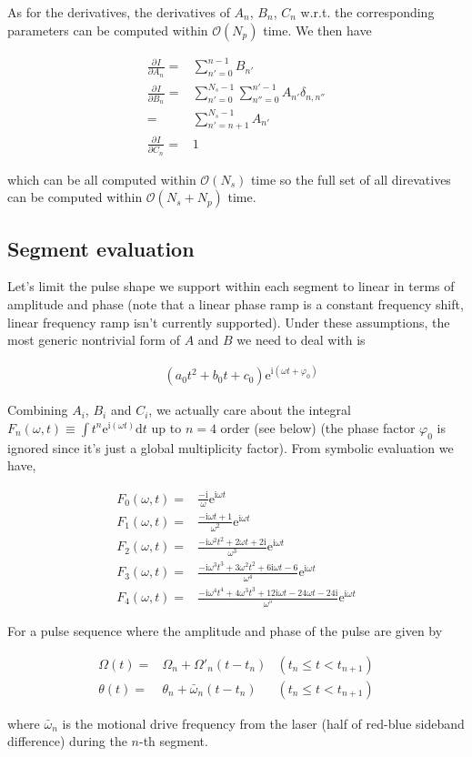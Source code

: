 \documentclass[10pt,fleqn]{article}
\newcommand{\ud}{\mathrm{d}}
\newcommand{\ue}{\mathrm{e}}
\newcommand{\ui}{\mathrm{i}}
\newcommand{\eqar}[1]
{
  \begin{align*}
    #1
  \end{align*}
}
\newcommand{\paren}[1]{{\left({#1}\right)}}
\newcommand{\pdiff}[3][{}]{{\frac{\partial^{#1} {#2}}{\partial {#3}{}^{#1}}}}
\begin{document}
As for the derivatives, the derivatives of $A_n$, $B_n$, $C_n$ w.r.t.
the corresponding parameters can be computed within $\mathcal{O}(N_p)$ time.
We then have
\eqar{
  \pdiff{I}{A_n}=&\sum_{n'=0}^{n-1}B_{n'}\\
  \pdiff{I}{B_n}=&\sum_{n'=0}^{N_s-1}\sum_{n''=0}^{n'-1}A_{n'}\delta_{n,n''}\\
  =&\sum_{n'=n+1}^{N_s-1}A_{n'}\\
  \pdiff{I}{C_n}=&1
}
which can be all computed within $\mathcal{O}(N_s)$ time so the full set of
all direvatives can be computed within $\mathcal{O}(N_s+N_p)$ time.

\subsection{Segment evaluation}
Let's limit the pulse shape we support within each segment to linear in terms of
amplitude and phase (note that a linear phase ramp is a constant frequency shift,
linear frequency ramp isn't currently supported).
Under these assumptions, the most generic nontrivial form of $A$ and $B$
we need to deal with is
\eqar{
  &(a_0t^2 + b_0t + c_0)\ue^{\ui \paren{\omega t + \varphi_0}}
}
Combining $A_i$, $B_i$ and $C_i$, we actually care about the integral
$\displaystyle F_n(\omega, t)\equiv\int t^n\ue^{\ui \paren{\omega t}}\ud t$
up to $n=4$ order (see below) (the phase factor $\varphi_0$ is ignored
since it's just a global multiplicity factor). From symbolic evaluation we have,
\eqar{
  F_0(\omega, t)=&\frac{-\ui}{\omega}\ue^{\ui\omega t}\\
  F_1(\omega, t)=&\frac{-\ui\omega t + 1}{\omega^2}\ue^{\ui\omega t}\\
  F_2(\omega, t)=&\frac{-\ui\omega^2t^2+2\omega t+2\ui}{\omega^3}\ue^{\ui\omega t}\\
  F_3(\omega, t)=&\frac{-\ui\omega^3t^3+3\omega^2t^2+6\ui\omega t-6}{\omega^4}\ue^{\ui\omega t}\\
  F_4(\omega, t)=&\frac{-\ui\omega^4t^4+4\omega^3t^3+12\ui\omega t-24\omega t-24\ui}{\omega^5}\ue^{\ui\omega t}
}

For a pulse sequence where the amplitude and phase of the pulse are given by
\eqar{
  \Omega(t)=&\Omega_n+\Omega'_n\paren{t-t_n}&(t_n\leqslant t<t_{n+1})\\
  \theta(t)=&\theta_n+\bar\omega_n\paren{t-t_n}&(t_n\leqslant t<t_{n+1})
}
where $\bar\omega_n$ is the motional drive frequency from the laser
(half of red-blue sideband difference) during the $n$-th segment.\\
\end{document}
